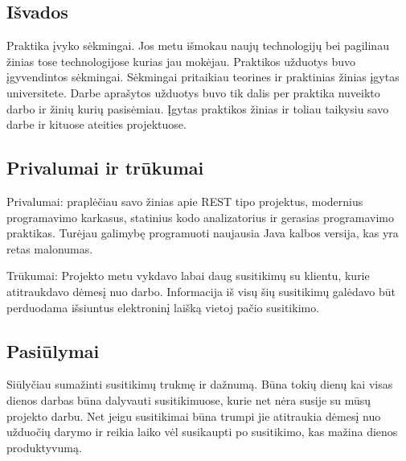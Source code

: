 \documentclass{VUMIFPSkursinis}
\begin{document}
	\subsection{Išvados}
		Praktika įvyko sėkmingai. Jos metu išmokau naujų technologijų bei pagilinau žinias tose technologijose kurias jau mokėjau. 
		Praktikos užduotys buvo įgyvendintos sėkmingai. Sėkmingai pritaikiau teorines ir praktinias žinias įgytas universitete.
		Darbe aprašytos užduotys buvo tik dalis per praktika nuveikto darbo ir žinių kurių pasisėmiau.
		Įgytas praktikos žinias ir toliau taikysiu savo darbe ir kituose ateities projektuose.
		
	\subsection{Privalumai ir trūkumai}
		Privalumai: praplėčiau savo žinias apie REST tipo projektus, modernius programavimo karkasus, statinius kodo analizatorius ir gerasias programavimo
		praktikas. Turėjau galimybę programuoti naujausia Java kalbos versija, kas yra retas malonumas.  

		Trūkumai: Projekto metu vykdavo labai daug susitikimų su klientu, kurie atitraukdavo dėmesį nuo darbo. Informacija iš visų šių susitikimų galėdavo būt perduodama išsiuntus elektroninį laišką vietoj pačio susitikimo.

	\subsection{Pasiūlymai}
		Siūlyčiau sumažinti susitikimų trukmę ir dažnumą. Būna tokių dienų kai visas dienos darbas būna dalyvauti susitikimuose, kurie net nėra susije su mūsų 
		projekto darbu. Net jeigu susitikimai būna trumpi jie atitraukia dėmesį nuo užduočių darymo ir reikia laiko vėl susikaupti po susitikimo, kas mažina dienos produktyvumą.
		
\printbibliography[heading=bibintoc]
\end{document}
